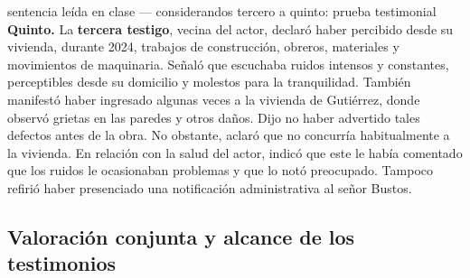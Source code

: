 \documentclass[12pt,oneside]{book}
\begin{document}
\begin{example}{sentencia le\'ida en clase --- considerandos tercero a quinto: prueba testimonial}
\textbf{Quinto.} La \textbf{tercera testigo}, vecina del actor, declar\'o haber percibido desde su vivienda, durante 2024, trabajos de construcci\'on, obreros, materiales y movimientos de maquinaria. Se\~nal\'o que escuchaba ruidos intensos y constantes, perceptibles desde su domicilio y molestos para la tranquilidad. Tambi\'en manifest\'o haber ingresado algunas veces a la vivienda de Guti\'errez, donde observ\'o grietas en las paredes y otros da\~nos. Dijo no haber advertido tales defectos antes de la obra. No obstante, aclar\'o que no concurr\'ia habitualmente a la vivienda. En relaci\'on con la salud del actor, indic\'o que este le hab\'ia comentado que los ruidos le ocasionaban problemas y que lo not\'o preocupado. Tampoco refiri\'o haber presenciado una notificaci\'on administrativa al se\~nor Bustos.
\end{example}

\subsection{Valoraci\'on conjunta y alcance de los testimonios}
\end{document}
